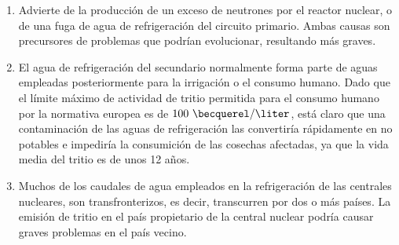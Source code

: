 \begin{enumerate}

\item  Advierte de la producción de un exceso de neutrones por el reactor nuclear, o de una fuga de agua de refrigeración del circuito primario. Ambas causas son precursores de problemas que podrían evolucionar, resultando más graves.

\item  El agua de refrigeración del secundario normalmente forma parte de aguas  empleadas posteriormente para la irrigación o el consumo humano. Dado que el límite máximo de actividad de tritio permitida para el consumo humano por la normativa europea  es de $100~\becquerel/\liter$, está claro que  una contaminación de las aguas de refrigeración las convertiría rápidamente en no potables e impediría la consumición de las cosechas afectadas, ya que la vida media del tritio es de unos 12 años.

\item  Muchos de los caudales de agua empleados en la refrigeración de las centrales nucleares, son transfronterizos, es decir, transcurren por dos o más países.  La emisión de tritio en el país propietario de la central nuclear podría causar graves problemas en el país vecino.


\end{enumerate}


